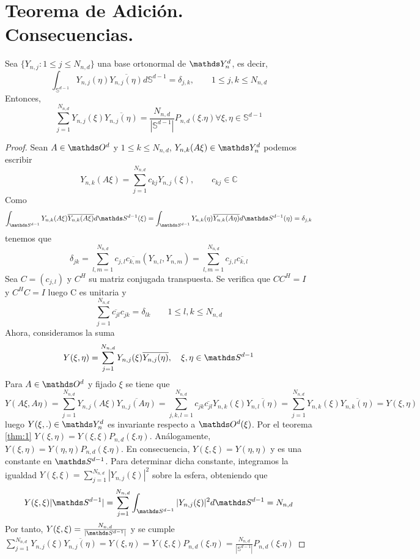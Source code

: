 \section{Teorema de Adición. Consecuencias.}
\begin{thm}
Sea $\{Y_{n,j}:1\le j \le N_{n,d}\}$ una base ortonormal de $\spharm$, es decir,
$$
\int_{\mathds{S}^{d-1}} Y_{n,j}(\eta)\overline{Y_{n,j}(\eta)} d\mathds{S}^{d-1} = \delta_{j,k},\qquad	1 \le j,k \le N_{n,d}
$$
Entonces, 
$$
\sum_{j=1}^{N_{n,d}}Y_{n,j}(\xi)\overline{Y_{n,j}(\eta)} = \frac{N_{n,d}}{|\mathds{S}^{d-1}|}P_{n,d}(\xi.\eta)		\forall \xi,\eta \in \mathds{S}^{d-1}
$$

\end{thm}
\begin{proof}Sean $A\in\orto$ y $1\le k \le N_{n,d}$, $Y_{n,k}(A\xi)\in \spharm$ podemos escribir
$$
Y_{n,k}(A\xi) = \sum_{j=1}^{N_{n,d}} c_{kj}Y_{n,j}(\xi), \qquad  c_{kj}\in\mathds{C}
$$
Como $$
\int_{\sphere} Y_{n,k}(A\xi) \overline{Y_{n,k}(A\xi) } d\sphere(\xi) = \int_{\sphere} Y_{n,k}(\eta) \overline{Y_{n,k}(A\eta) } d\sphere(\eta) =\delta_{j,k}
$$
tenemos que 
$$
\delta_{jk} = \sum_{l,m = 1}^{N_{n,d}} c_{j,l}\overline{c_{k,m}}(Y_{n,l},Y_{n,m}) = \sum_{l,m = 1}^{N_{n,d}} c_{j,l}\overline{c_{k,l}}
$$
Sea $C=(c_{j,l})$ y $C^H$ su matriz conjugada transpuesta. Se verifica que $CC^H=I$ y $C^HC=I$ luego C es unitaria y
$$
\sum_{j=1}^{N_{n,d}} \overline{c_{jl}}c_{jk} = \delta_{lk} \qquad 1\le l,k \le N_{n,d}
$$
Ahora, consideramos la suma
$$
Y(\xi,\eta) = \sum_{j=1}^{N_{n,d}} Y_{n,j}(\xi)\overline{ Y_{n,j}(\eta)} ,\quad \xi,\eta\in\sphere
$$
Para $A\in\orto$ y fijado $\xi$ se tiene que
$$
Y(A\xi,A\eta) = \sum_{j=1}^{N_{n,d}} Y_{n,j}(A\xi)\overline{ Y_{n,j}(A\eta)} = \sum_{j,k,l=1}^{N_{n,d}} c_{jk}\overline{c_{jl}} Y_{n,k}(\xi)\overline{ Y_{n,l}(\eta)} = \sum_{j=1}^{N_{n,d}} Y_{n,k}(\xi)\overline{ Y_{n,k}(\eta)} = Y(\xi,\eta)
$$
luego $Y(\xi,.)\in\spharm$ es invariante respecto a $\orto(\xi)$. Por el teorema \ref{thm:1} $Y(\xi,\eta)=Y(\xi,\xi)P_{n,d}(\xi.\eta)$. Análogamente, $Y(\xi,\eta)=Y(\eta,\eta)P_{n,d}(\xi.\eta)$. En consecuencia, $Y(\xi,\xi) = Y(\eta,\eta)$ y es una constante en $\sphere$. Para determinar dicha constante, integramos la igualdad  $Y(\xi,\xi) =  \sum_{j=1}^{N_{n,d}} |Y_{n,j}(\xi)|^2 $ sobre la esfera, obteniendo que
$$
Y(\xi,\xi)|\sphere| =  \sum_{j=1}^{N_{n,d}}\int_{\sphere} |Y_{n,j}(\xi)|^2 d\sphere = N_{n,d}
$$
Por tanto, $Y(\xi,\xi)=\frac{N_{n,d}}{|\sphere|}$ y se cumple $\sum_{j=1}^{N_{n,d}}Y_{n,j}(\xi)\overline{Y_{n,j}(\eta)}= Y(\xi,\eta)=Y(\xi,\xi)P_{n,d}(\xi.\eta) = \frac{N_{n,d}}{|\mathds{S}^{d-1}|}P_{n,d}(\xi.\eta)	$
\end{proof}
\medskip 

